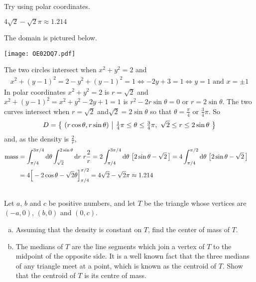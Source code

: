 \begin{hint}
Try using polar coordinates.
\end{hint}

\begin{answer}
$4\sqrt{2} -\sqrt{2}\pi\approx 1.214$
\end{answer}

\begin{solution}
The domain is pictured below.
\begin{center}
     \texttt{[image: OE02DQ7.pdf]}
\end{center}
The two circles intersect when $x^2+y^2=2$ and
\begin{align*}
x^2+(y-1)^2=2-y^2+(y-1)^2=1
\iff -2y+3=1\iff y=1\text{ and } x=\pm 1
\end{align*}
In polar coordinates $x^2+y^2=2$ is $r=\sqrt{2}$ and 
$x^2+(y-1)^2=x^2+y^2-2y+1=1$ is $r^2-2r\sin\theta=0$ or $r=2\sin\theta$.
The two curves intersect when $r=\sqrt{2}$ and$\sqrt{2}=2\sin\theta$ so that 
$\theta=\frac{\pi}{4}$ or $\frac{3}{4}\pi$. So 
\begin{equation*}
D=\Set{(r\cos\theta,r\sin\theta)}{\tfrac{1}{4}\pi\le\theta\le\tfrac{3}{4}\pi,\ 
          \sqrt{2}\le r\le 2\sin\theta}
\end{equation*}
and, as the density is $\frac{2}{r}$,
\begin{align*}
\text{mass}
&=\int_{\pi/4}^{3\pi/4}\dee{\theta}\int^{2\sin\theta}_{\sqrt{2}}\dee{r}\ 
          r\frac{2}{r}
=2\int_{\pi/4}^{3\pi/4}\dee{\theta}\ \big[2\sin\theta -\sqrt{2}\,\big]
=4\int_{\pi/4}^{\pi/2}\dee{\theta}\ \big[2\sin\theta -\sqrt{2}\,\big] \cr
&=4\Big[-2\cos\theta -\sqrt{2}\theta\Big] _{\pi/4}^{\pi/2}
=4\sqrt{2} -\sqrt{2}\pi\approx 1.214
\end{align*}
\end{solution}


\subsection*{\Application}

\begin{question}[M200 2003A] %
Let $a$, $b$ and $c$ be positive numbers, and let $T$ be
the triangle whose vertices are $(-a,0)$, $(b,0)$ and $(0,c)$.
\begin{enumerate}[(a)]
\item 
Assuming that the density is constant on $T$, find the center
of mass of $T$.

\item 
The medians of $T$ are the line segments which join a vertex
of $T$ to the midpoint of the opposite side. It is a well known fact that the
three medians of any triangle meet at a point, which is known as the centroid
of $T$. Show that the centroid of $T$ is its centre of mass.
\end{enumerate}
\end{question}

